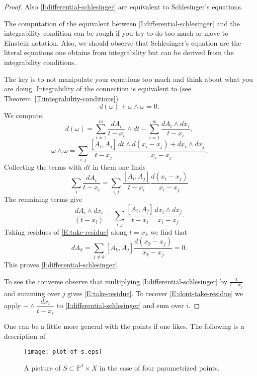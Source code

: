 \documentclass[12pt]{book}
\numberwithin{equation}{section}
\theoremstyle{definition}
\theoremstyle{remark}
\newcommand{\PP}{\mathbb{P}}
\begin{document}
\begin{proof}
	 Also \eqref{I:differential-schlesinger} are equivalent to Schlesinger's equations.
	
	The computation of the equivalent between \eqref{I:differential-schlesinger} and the integrability condition can be rough if you try to do too much or move to Einstein notation.
	Also, we should observe that Schlesinger's equation are the literal equations one obtains from integrability but can be derived from the integrability conditions.
	
	The key is to not manipulate your equations too much and think about what you are doing.
	Integrability of the connection is equivalent to (see Theorem~\ref{T:integrability-conditions}) $$d(\omega)+\omega\wedge \omega=0.$$ 
	We compute.
	 $$d(\omega) = \sum_{i=1}^m \frac{dA_i}{t-x_i}\wedge dt - \sum_{i=1}^m \frac{dA_i \wedge dx_i}{t-x_i},$$
	 $$\omega \wedge \omega = \sum_{i,j} \frac{[A_i,A_j]}{t-x_j} \frac{dt\wedge d(x_i-x_j) + dx_i \wedge dx_j}{x_i-x_j}.$$
	 Collecting the terms with $dt$ in them one finds
	 \begin{equation}\label{E:take-residue}
	  \sum_{i} \frac{dA_i}{t-x_i} = \sum_{i,j} \frac{[A_i,A_j]}{t-x_i}\frac{d(x_i-x_j)}{x_i-x_j}
	 \end{equation}
	 The remaining terms give
	 \begin{equation}\label{E:dont-take-residue}
	  \dfrac{dA_i \wedge dx_i}{(t-x_i)} = \sum_{i,j} \frac{[A_i,A_j]}{t-x_i}\frac{dx_i\wedge dx_j}{x_i-x_j}.
	 \end{equation}
	 Taking residues of \eqref{E:take-residue} along $t=x_k$ we find that 
	  $$ dA_k = \sum_{j\neq k} [A_k,A_j] \frac{d(x_k-x_j)}{x_k-x_j}=0.$$
	 This proves \eqref{I:differential-schlesinger}.
	 
	 To see the converse observe that multiplying \eqref{I:differential-schlesinger} by $\frac{1}{t-x_j}$ and summing over $j$ gives \eqref{E:take-residue}.
	 To recover \eqref{E:dont-take-residue} we apply $-\wedge \dfrac{dx_i}{t-x_i}$ to \eqref{I:differential-schlesinger} and sum over $i$.
\end{proof}


One can be a little more general with the points if one likes.  
The following is a description of 

\begin{figure}[h]\label{F:plot-of-s}
	\begin{center}
		\texttt{[image: plot-of-s.eps]}
	\end{center}
\caption{A picture of $S \subset \PP^1\times X$ in the case of four parametrized points.}
\end{figure}
\end{document}
